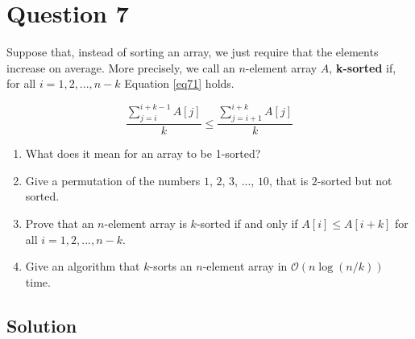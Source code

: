 
\section*{Question 7}

Suppose that, instead of sorting an array, we just require that the elements increase on average.
More precisely, we call an $n$-element array $A$, \textbf{k-sorted} if, for all $i = 1, 2, ..., n-k$ Equation \ref{eq71} holds.

\begin{equation}\label{eq71}
\frac{\sum_{j=i}^{i + k - 1} A[j]}{k} \leq \frac{\sum_{j=i+1}^{i + k} A[j]}{k}
\end{equation}

\begin{enumerate}[label=(\alph*)]
\item What does it mean for an array to be 1-sorted?
\item Give a permutation of the numbers $1$, $2$, $3$, ..., $10$, that is $2$-sorted but not sorted.
\item Prove that an $n$-element array is $k$-sorted if and only if $A[i] \leq A[i+k]$ for all $i = 1, 2, ..., n-k$.
\item Give an algorithm that $k$-sorts an $n$-element array in $\mathcal{O}(n \log (n/k))$ time.
\end{enumerate}

\subsection*{Solution}

